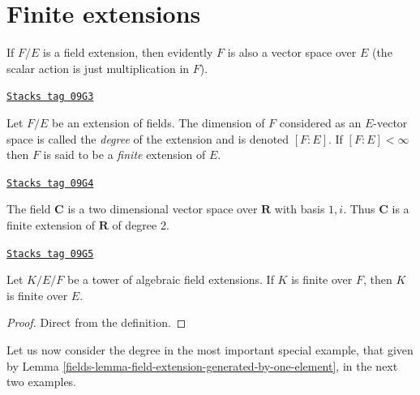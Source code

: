 \section{Finite extensions}
\label{fields-section-finite-extensions}
If $F/E$ is a field extension, then evidently $F$ is also a vector space
over $E$ (the scalar action is just multiplication in $F$).

\begin{definition}[Degree]
\label{fields-definition-degree}
\href{https://stacks.math.columbia.edu/tag/09G3}{\texttt{Stacks tag 09G3}}

Let $F/E$ be an extension of fields. The dimension of $F$ considered as an
$E$-vector space is called the {\it degree} of the extension and is
denoted $[F : E]$. If $[F : E] < \infty$ then $F$ is said to be a
{\it finite} extension of $E$.
\end{definition}

\begin{example}[C over R]
\label{fields-example-C-over-R}
\href{https://stacks.math.columbia.edu/tag/09G4}{\texttt{Stacks tag 09G4}}

The field $\mathbf{C}$ is a two dimensional vector space over $\mathbf{R}$
with basis $1, i$. Thus $\mathbf{C}$ is a finite extension of $\mathbf{R}$
of degree 2.
\end{example}

\begin{lemma}
\label{fields-lemma-finite-goes-up}
\href{https://stacks.math.columbia.edu/tag/09G5}{\texttt{Stacks tag 09G5}}

Let $K/E/F$ be a tower of algebraic field extensions.
If $K$ is finite over $F$, then $K$ is finite over $E$.
\end{lemma}

\begin{proof}
Direct from the definition.
\end{proof}

Let us now consider the degree in the most important special example, that
given by Lemma \ref{fields-lemma-field-extension-generated-by-one-element}, in the
next two examples.

